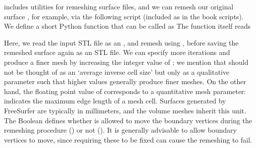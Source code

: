 \svmtk{} includes utilities for remeshing surface files, and we can
remesh our original surface , for example, via the
following script (included as  in
the book scripts). We define a short Python function
 that can be called as
%
%
\noindent The function itself reads

\noindent Here, we read the input STL file as an \svmtk{}
, and remesh using
, before saving the remeshed
surface again as an STL file. We can specify more iterations and
produce a finer mesh by increasing the integer value of
; we mention that  should not be
thought of as an `average inverse cell size' but only as a qualitative
parameter such that higher values generally produce finer meshes. On
the other hand, the floating point value of 
corresponds to a quantitative mesh parameter: 
indicates the maximum edge length of a mesh cell. Surfaces generated
by FreeSurfer are typically in millimeters, and the volume meshes
inherit this unit. The Boolean
 defines whether \svmtk{}
is allowed to move the boundary vertices during the remeshing
procedure () or not (). It is
generally advisable to allow boundary vertices to move, since
requiring these to be fixed can cause the remeshing to fail.

